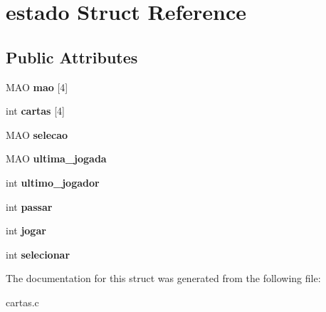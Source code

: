 \hypertarget{structestado}{}\section{estado Struct Reference}
\label{structestado}
\subsection*{Public Attributes}
\begin{DoxyCompactItemize}
\item 
\hypertarget{structestado_a69ee2cdf37e53968050df5c4b8e2cf51}{}M\+A\+O {\bfseries mao} \mbox{[}4\mbox{]}\label{structestado_a69ee2cdf37e53968050df5c4b8e2cf51}

\item 
\hypertarget{structestado_a1108e4a26e3cd7ed12209927c5afaa2d}{}int {\bfseries cartas} \mbox{[}4\mbox{]}\label{structestado_a1108e4a26e3cd7ed12209927c5afaa2d}

\item 
\hypertarget{structestado_a0aebf86be9107cb9fba93176fe31b5b9}{}M\+A\+O {\bfseries selecao}\label{structestado_a0aebf86be9107cb9fba93176fe31b5b9}

\item 
\hypertarget{structestado_adbe7db5c55b9ffff331f0a551a8c0212}{}M\+A\+O {\bfseries ultima\+\_\+jogada}\label{structestado_adbe7db5c55b9ffff331f0a551a8c0212}

\item 
\hypertarget{structestado_acb67e3c2edb271ab6fa1139396c5e247}{}int {\bfseries ultimo\+\_\+jogador}\label{structestado_acb67e3c2edb271ab6fa1139396c5e247}

\item 
\hypertarget{structestado_ab5235787eaa8f2232dd0f169c1b0103b}{}int {\bfseries passar}\label{structestado_ab5235787eaa8f2232dd0f169c1b0103b}

\item 
\hypertarget{structestado_a811169e14611adf0ee1238769322dccc}{}int {\bfseries jogar}\label{structestado_a811169e14611adf0ee1238769322dccc}

\item 
\hypertarget{structestado_a1e1d9c5294c9228dc51aa20f3998c672}{}int {\bfseries selecionar}\label{structestado_a1e1d9c5294c9228dc51aa20f3998c672}

\end{DoxyCompactItemize}


The documentation for this struct was generated from the following file\+:\begin{DoxyCompactItemize}
\item 
cartas.\+c\end{DoxyCompactItemize}

